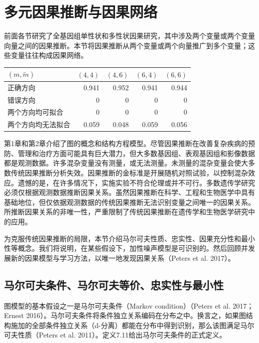 \section{多元因果推断与因果网络}

前面各节研究了全基因组单性状和多性状因果研究，其中涉及两个变量或两个变量向量之间的因果推断。本节将因果推断从两个变量或两个向量推广到多个变量；这些变量往往构成因果网络。

\begin{table}[htbp]
\centering
{}
\begin{tabular}{lrrrr}
\toprule
$(m,\widetilde m)$&$(4,4)$&$(4,6)$&$(6,4)$&$(6,6)$\\
\midrule
正确方向&0.941&0.952&0.941&0.944\\
错误方向&0&0&0&0\\
两个方向均可拟合&0&0&0&0\\
两个方向均无法拟合&0.059&0.048&0.059&0.056\\
\bottomrule
\end{tabular}
\end{table}

第1章和第2章介绍了图的概念和结构方程模型。尽管因果推断在改善复杂疾病的预防、管理和治疗方面可能具有巨大潜力，但大多数基因组、表观基因组和影像数据都是观测数据。许多混杂变量没有测量，或无法测量。未测量的混杂变量会使大多数传统因果推断分析失效。因果推断的金标准是开展随机对照试验，以控制混杂效应。遗憾的是，在许多情况下，实施实验不符合伦理或并不可行。多数遗传学研究必须仅根据观测数据推断因果关系。虽然因果推断在科学、工程和生物医学中具有基础地位，但仅依据观测数据的传统因果推断无法识别变量之间唯一的因果关系。所推断因果关系的非唯一性，严重限制了传统因果推断在遗传学和生物医学研究中的应用。

为克服传统因果推断的局限，本节介绍马尔可夫性质、忠实性、因果充分性和最小性等概念。我们将说明，在某些假设下，加性噪声模型是可识别的。然后回顾并发展新的因果模型与学习方法，以唯一地发现因果关系（Peters et al. 2017）。

\subsection{马尔可夫条件、马尔可夫等价、忠实性与最小性}

图模型的基本假设之一是马尔可夫条件（Markov condition）（Peters et al. 2017；Ernest 2016）。马尔可夫条件将条件独立关系编码在分布之中。换言之，如果图结构施加的全部条件独立关系（d-分离）都能在分布中得到识别，那么该图满足马尔可夫性质（Peters et al. 2011）。定义7.11给出马尔可夫条件的正式定义。

